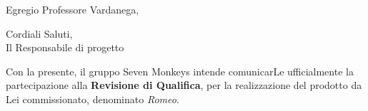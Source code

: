 \documentclass[10pt,a4paper,sans]{moderncv}        %
\begin{document}
\date{\emph{29 Marzo 2014}}
\opening{Egregio Professore Vardanega,}
\closing{Cordiali Saluti, \\ Il Responsabile di progetto	}
\makelettertitle

Con la presente, il gruppo Seven Monkeys intende comunicarLe ufficialmente la partecipazione alla \textbf{Revisione di Qualifica}, per la realizzazione del prodotto da Lei commissionato, denominato \textit{Romeo}.
\end{document}

